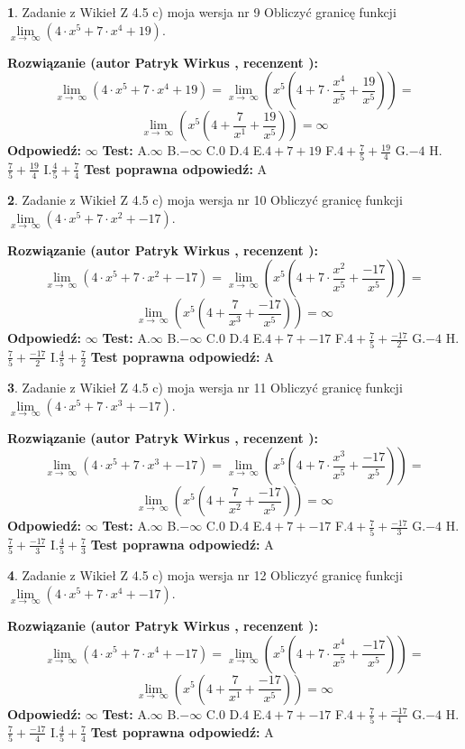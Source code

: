 \documentclass[12pt, a4paper]{article}
\theoremstyle{definition} %
\newtheorem{zad}{}
\newcommand{\zadStart}[1]{\begin{zad}#1\newline}
\newcommand{\zadStop}{\end{zad}}
\newcommand{\rozwStart}[2]{\noindent \textbf{Rozwiązanie (autor #1 , recenzent #2): }\newline}
\newcommand{\rozwStop}{\newline}
\newcommand{\odpStart}{\noindent \textbf{Odpowiedź:}\newline}
\newcommand{\odpStop}{\newline}
\newcommand{\testStart}{\noindent \textbf{Test:}\newline}
\newcommand{\testStop}{\newline}
\newcommand{\kluczStart}{\noindent \textbf{Test poprawna odpowiedź:}\newline}
\newcommand{\kluczStop}{\newline}
\begin{document}
\zadStart{Zadanie z Wikieł Z 4.5 c) moja wersja nr 9}
Obliczyć granicę funkcji  $\lim\limits_{x\to\ \infty}(4 \cdot x^{5}+7 \cdot x^{4}+19)$.
\zadStop
\rozwStart{Patryk Wirkus}{}
$$\lim\limits_{x\to\ \infty}(4 \cdot x^{5}+7 \cdot x^{4}+19) = \lim\limits_{x\to\ \infty}(x^{5}(4 +7 \cdot \frac{x^{4}}{x^{5}}+\frac{19}{x^{5}})) =$$ $$\lim\limits_{x\to\ \infty}(x^{5}(4 +\frac{7}{x^{1}}+\frac{19}{x^{5}})) =\infty$$
\rozwStop
\odpStart
$\infty$
\odpStop
\testStart
A.$\infty$ B.$-\infty$ C.$0$ D.$4$ E.$4 + 7 + 19$
F.$4+\frac{7}{5}+\frac{19}{4}$ G.$-4$
H.$\frac{7}{5}+\frac{19}{4}$
I.$\frac{4}{5}+\frac{7}{4}$
\testStop
\kluczStart
A
\kluczStop



\zadStart{Zadanie z Wikieł Z 4.5 c) moja wersja nr 10}
Obliczyć granicę funkcji  $\lim\limits_{x\to\ \infty}(4 \cdot x^{5}+7 \cdot x^{2}+-17)$.
\zadStop
\rozwStart{Patryk Wirkus}{}
$$\lim\limits_{x\to\ \infty}(4 \cdot x^{5}+7 \cdot x^{2}+-17) = \lim\limits_{x\to\ \infty}(x^{5}(4 +7 \cdot \frac{x^{2}}{x^{5}}+\frac{-17}{x^{5}})) =$$ $$\lim\limits_{x\to\ \infty}(x^{5}(4 +\frac{7}{x^{3}}+\frac{-17}{x^{5}})) =\infty$$
\rozwStop
\odpStart
$\infty$
\odpStop
\testStart
A.$\infty$ B.$-\infty$ C.$0$ D.$4$ E.$4 + 7 + -17$
F.$4+\frac{7}{5}+\frac{-17}{2}$ G.$-4$
H.$\frac{7}{5}+\frac{-17}{2}$
I.$\frac{4}{5}+\frac{7}{2}$
\testStop
\kluczStart
A
\kluczStop



\zadStart{Zadanie z Wikieł Z 4.5 c) moja wersja nr 11}
Obliczyć granicę funkcji  $\lim\limits_{x\to\ \infty}(4 \cdot x^{5}+7 \cdot x^{3}+-17)$.
\zadStop
\rozwStart{Patryk Wirkus}{}
$$\lim\limits_{x\to\ \infty}(4 \cdot x^{5}+7 \cdot x^{3}+-17) = \lim\limits_{x\to\ \infty}(x^{5}(4 +7 \cdot \frac{x^{3}}{x^{5}}+\frac{-17}{x^{5}})) =$$ $$\lim\limits_{x\to\ \infty}(x^{5}(4 +\frac{7}{x^{2}}+\frac{-17}{x^{5}})) =\infty$$
\rozwStop
\odpStart
$\infty$
\odpStop
\testStart
A.$\infty$ B.$-\infty$ C.$0$ D.$4$ E.$4 + 7 + -17$
F.$4+\frac{7}{5}+\frac{-17}{3}$ G.$-4$
H.$\frac{7}{5}+\frac{-17}{3}$
I.$\frac{4}{5}+\frac{7}{3}$
\testStop
\kluczStart
A
\kluczStop



\zadStart{Zadanie z Wikieł Z 4.5 c) moja wersja nr 12}
Obliczyć granicę funkcji  $\lim\limits_{x\to\ \infty}(4 \cdot x^{5}+7 \cdot x^{4}+-17)$.
\zadStop
\rozwStart{Patryk Wirkus}{}
$$\lim\limits_{x\to\ \infty}(4 \cdot x^{5}+7 \cdot x^{4}+-17) = \lim\limits_{x\to\ \infty}(x^{5}(4 +7 \cdot \frac{x^{4}}{x^{5}}+\frac{-17}{x^{5}})) =$$ $$\lim\limits_{x\to\ \infty}(x^{5}(4 +\frac{7}{x^{1}}+\frac{-17}{x^{5}})) =\infty$$
\rozwStop
\odpStart
$\infty$
\odpStop
\testStart
A.$\infty$ B.$-\infty$ C.$0$ D.$4$ E.$4 + 7 + -17$
F.$4+\frac{7}{5}+\frac{-17}{4}$ G.$-4$
H.$\frac{7}{5}+\frac{-17}{4}$
I.$\frac{4}{5}+\frac{7}{4}$
\testStop
\kluczStart
A
\kluczStop
\end{document}
